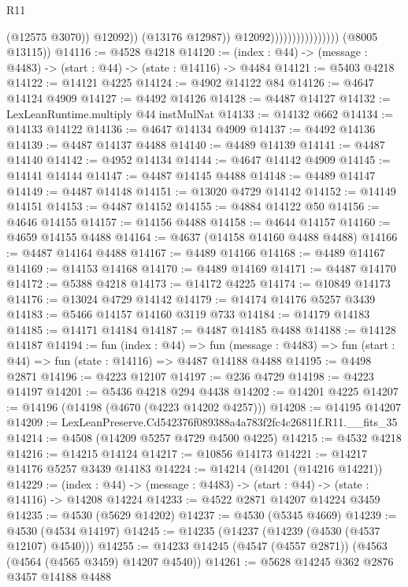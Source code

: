 \begin{lexlean}{R11}
\begin{coremodule}
                                              (@12575 @3070))
                                            @12092))
                                        (@13176 @12987))
                                      @12092))))))))))))))))
      (@8005 @13115))
@14116 := @4528 @4218
@14120 := (index : @44) -> (message : @4483) -> (start : @44) -> (state : @14116) -> @4484
@14121 := @5403 @4218
@14122 := @14121 @4225
@14124 := @4902 @14122 @84
@14126 := @4647 @14124 @4909
@14127 := @4492 @14126
@14128 := @4487 @14127
@14132 := LexLeanRuntime.multiply @44 instMulNat
@14133 := @14132 @662
@14134 := @14133 @14122
@14136 := @4647 @14134 @4909
@14137 := @4492 @14136
@14139 := @4487 @14137 @4488
@14140 := @4489 @14139
@14141 := @4487 @14140
@14142 := @4952 @14134
@14144 := @4647 @14142 @4909
@14145 := @14141 @14144
@14147 := @4487 @14145 @4488
@14148 := @4489 @14147
@14149 := @4487 @14148
@14151 := @13020 @4729 @14142
@14152 := @14149 @14151
@14153 := @4487 @14152
@14155 := @4884 @14122 @50
@14156 := @4646 @14155
@14157 := @14156 @4488
@14158 := @4644 @14157
@14160 := @4659 @14155 @4488
@14164 := @4637 (@14158 @14160 @4488 @4488)
@14166 := @4487 @14164 @4488
@14167 := @4489 @14166
@14168 := @4489 @14167
@14169 := @14153 @14168
@14170 := @4489 @14169
@14171 := @4487 @14170
@14172 := @5388 @4218
@14173 := @14172 @4225
@14174 := @10849 @14173
@14176 := @13024 @4729 @14142
@14179 := @14174 @14176 @5257 @3439
@14183 := @5466 @14157 @14160 @3119 @733
@14184 := @14179 @14183
@14185 := @14171 @14184
@14187 := @4487 @14185 @4488
@14188 := @14128 @14187
@14194 := fun (index : @44) =>
  fun (message : @4483) => fun (start : @44) => fun (state : @14116) => @4487 @14188 @4488
@14195 := @4498 @2871
@14196 := @4223 @12107
@14197 := @236 @4729
@14198 := @4223 @14197
@14201 := @5436 @4218 @294 @4438
@14202 := @14201 @4225
@14207 := @14196 (@14198 (@4670 (@4223 @14202 @4257)))
@14208 := @14195 @14207
@14209 := LexLeanPreserve.Cd542376f089388a4a783f2fc4c26811f.R11.__fits_35
@14214 := @4508 (@14209 @5257 @4729 @4500 @4225)
@14215 := @4532 @4218
@14216 := @14215 @14124
@14217 := @10856 @14173
@14221 := @14217 @14176 @5257 @3439 @14183
@14224 := @14214 (@14201 (@14216 @14221))
@14229 := (index : @44) -> (message : @4483) -> (start : @44) -> (state : @14116) -> @14208 @14224
@14233 := @4522 @2871 @14207 @14224 @3459
@14235 := @4530 (@5629 @14202)
@14237 := @4530 (@5345 @4669)
@14239 := @4530 (@4534 @14197)
@14245 := @14235 (@14237 (@14239 (@4530 (@4537 @12107) @4540)))
@14255 := @14233 @14245 (@4547 (@4557 @2871)) (@4563 (@4564 (@4565 @3459) @14207 @4540))
@14261 := @5628 @14245 @362 @2876 @3457 @14188 @4488

\end{coremodule}
\end{lexlean}
